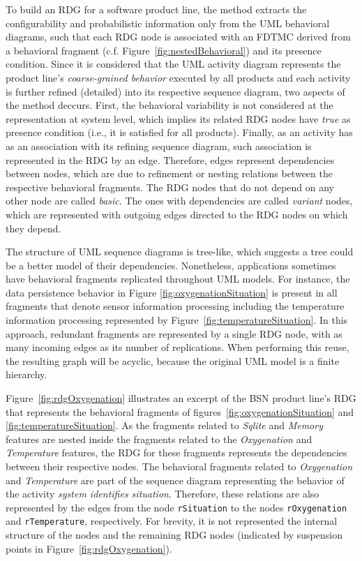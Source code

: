 To build an RDG for a software product line, the method extracts the
configurability and probabilistic information only from the UML behavioral
diagrams, such that each RDG node is associated with an FDTMC derived from a
behavioral fragment (c.f. Figure~\ref{fig:nestedBehavioral}) and its presence
condition.  Since it is considered that the
UML activity diagram represents the product line's \textit{coarse-grained
behavior} executed by all products and each activity is further refined
(detailed) into its respective sequence diagram, two aspects of the method
deccurs.  First, the behavioral variability is not considered at the
representation at system level, which implies its related RDG nodes have
\textit{true} as presence condition (i.e., it is satisfied for all products).
Finally, as an activity has as an association with its refining sequence
diagram, such association is represented in the RDG by an edge. Therefore, edges
represent dependencies between nodes, which are due to refinement or nesting
relations between the respective behavioral fragments.  The RDG nodes that do
not depend on any other node are called \textit{basic}.  The ones with
dependencies are called \textit{variant} nodes, which are represented with
outgoing edges directed to the RDG nodes on which they depend. 

The structure of UML sequence diagrams is tree-like, which suggests a tree could
be a better model of their dependencies.  Nonetheless, applications sometimes
have behavioral fragments replicated throughout UML models. For instance, the
data persistence behavior in Figure \ref{fig:oxygenationSituation} is present in
all fragments that denote sensor information processing including the temperature information processing represented by Figure~\ref{fig:temperatureSituation}. In this approach,
redundant fragments are represented by a single RDG node, with as many incoming
edges as its number of replications.  When performing this reuse, the resulting
graph will be acyclic, because the original UML model is a finite hierarchy.

Figure~\ref{fig:rdgOxygenation} illustrates an excerpt of the BSN product line's
RDG that represents the behavioral fragments of
figures~\ref{fig:oxygenationSituation} and \ref{fig:temperatureSituation}. As
the fragments related to \textit{Sqlite} and \textit{Memory} features are nested
inside the fragments related to the \textit{Oxygenation} and \emph{Temperature}
features, the RDG for these fragments represents the dependencies between their
respective nodes. The behavioral fragments related to \textit{Oxygenation} and
\emph{Temperature} are part of the sequence diagram representing the behavior of
the activity \textit{system identifies situation}.  Therefore, these relations
are also represented by the edges from the node \texttt{rSituation}  to the
nodes \texttt{rOxygenation} and \texttt{rTemperature}, respectively. For
brevity, it is not represented the internal structure of the nodes and the
remaining RDG nodes (indicated by suspension points in Figure~\ref{fig:rdgOxygenation}).




